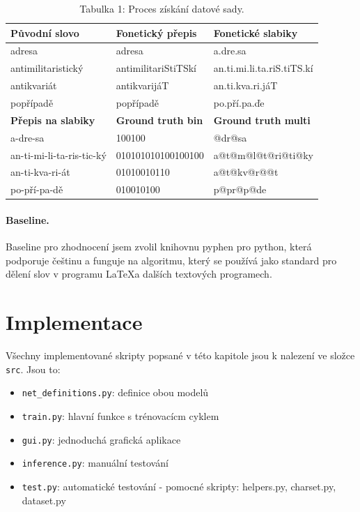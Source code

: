 \documentclass[a4paper]{article}
\theoremstyle{definition}
\begin{document}
\begin{table}[]
\centering
\caption{Tabulka 1: Proces získání datové sady.}
\begin{tabular}{|l|l|l|}
\hline
\textbf{Původní slovo}     & \textbf{Fonetický přepis}    & \textbf{Fonetické slabiky} \\ \hline
adresa                     & adresa                       & a.dre.sa                   \\ \hline
antimilitaristický         & antimilitariStiTSkí          & an.ti.mi.li.ta.riS.tiTS.kí \\ \hline
antikvariát                & antikvarijáT                 & an.ti.kva.ri.jáT           \\ \hline
popřípadě                  & popřípadě                    & po.pří.pa.ďe               \\ \hline
\textbf{Přepis na slabiky} & \textbf{Ground truth bin}    & \textbf{Ground truth multi}      \\ \hline
a-dre-sa                   & 100100                       & @dr@sa                     \\ \hline
an-ti-mi-li-ta-ris-tic-ký  & 010101010100100100           & a@t@m@l@t@ri@ti@ky         \\ \hline
an-ti-kva-ri-át            & 01010010110                  & a@t@kv@r@@t                \\ \hline
po-pří-pa-dě               & 010010100                    & p@pr@p@de                  \\ \hline
\end{tabular}
\label{table:dataset}
\end{table}

\paragraph{Baseline.}

Baseline pro zhodnocení jsem zvolil knihovnu pyphen pro python, která podporuje češtinu a funguje na algoritmu, který se používá jako standard pro dělení slov v programu \LaTeX a dalších textových programech.

\section{Implementace}
Všechny implementované skripty popsané v této kapitole jsou k nalezení ve složce \texttt{src}. Jsou to:

\begin{samepage}
  \begin{itemize}
    \item \texttt{net\_definitions.py}: definice obou modelů
    \item \texttt{train.py}: hlavní funkce s trénovacícm cyklem
    \item \texttt{gui.py}: jednoduchá grafická aplikace
    \item \texttt{inference.py}: manuální testování
    \item \texttt{test.py}: automatické testování
    - pomocné skripty: helpers.py, charset.py, dataset.py
  \end{itemize}
\end{samepage}
\end{document}
